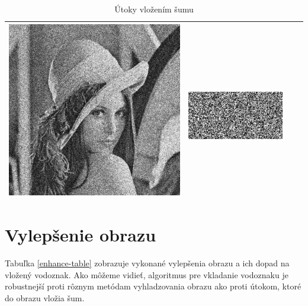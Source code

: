 \begin{table}[h]
\begin{tabular}{llcc}
\begin{minipage}[c]{.1\textwidth}
  \includegraphics[scale=0.1]{obrazky/PoissonNoise}
\end{minipage} & 
\begin{minipage}[c]{.15\textwidth}
\ 
  \includegraphics[scale=0.25]{obrazky/PoissonNoise-wm}
\end{minipage}  \\ \hline
\end{tabular}
\caption{Útoky vložením šumu}
\end{table}

\section{Vylepšenie obrazu} \label{enhance}
Tabuľka \ref{enhance-table} zobrazuje vykonané vylepšenia obrazu a ich dopad na vložený vodoznak. Ako môžeme vidieť, algoritmus pre vkladanie vodoznaku je robustnejší proti rôznym metódam vyhladzovania obrazu ako proti útokom, ktoré do obrazu vložia šum.

